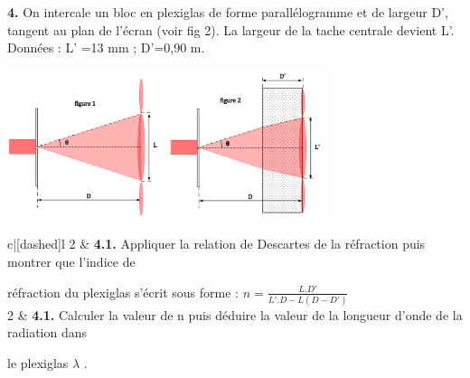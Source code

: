 \documentclass[12pt]{article}
\begin{document}
\textbf{4. } On intercale un bloc en plexiglas de forme parallélogramme et de largeur D’, tangent au plan de l’écran
(voir fig 2). La largeur de la tache centrale devient L’.
Données : L’ =13 mm ; D’=0,90 m.

\begin{center}
  \includegraphics[width=0.7\textwidth]{./img/phys04.png}
\end{center}

\begin{tblr}{c|[dashed]l}
2  & \textbf{4.1. } Appliquer la relation de Descartes de la réfraction puis montrer que l’indice de 

  réfraction du
  plexiglas s’écrit sous forme : $n = \frac{L.D'}{L'.D-L(D-D')}$ \\

2 & \textbf{4.1. } Calculer la valeur de n puis déduire la valeur de la longueur d’onde de la radiation dans

  le plexiglas $\lambda$ . \\

\end{tblr}
\end{document}
